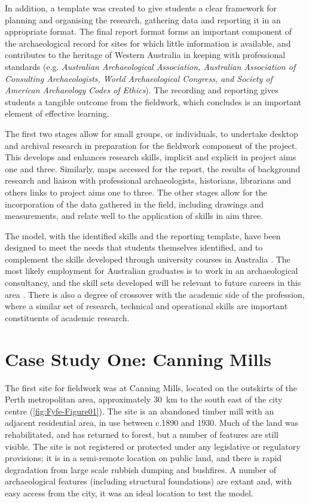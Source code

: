 \documentclass{ijsra}
\begin{document}
In addition, a template was created to give students a clear framework for planning and organising the research, gathering data and reporting it in an appropriate format. 
The final report format forms an important component of the archaeological record for sites for which little information is available, and contributes to the heritage of Western Australia in keeping with professional standards (e.g. \emph{Australian Archaeological Association, Australian Association of Consulting Archaeologists, World Archaeological Congress, and Society of American Archaeology Codes of Ethics}). 
The recording and reporting gives students a tangible outcome from the fieldwork, which \textcite[113-116]{mytum2012c} concludes is an important element of effective learning.

The first two stages allow for small groups, or individuals, to undertake desktop and archival research in preparation for the fieldwork component of the project. 
This develops and enhances research skills, implicit and explicit in project aims one and three. Similarly, maps accessed for the report, the results of background research and liaison with professional archaeologists, historians, librarians and others links to project aims one to three. 
The other stages allow for the incorporation of the data gathered in the field, including drawings and measurements, and relate well to the application of skills in aim three.

The model, with the identified skills and the reporting template, have been designed to meet the needs that students themselves identified, and to complement the skills developed through university courses in Australia \parencite[3]{beck2008}. 
The most likely employment for Australian graduates is to work in an archaeological consultancy, and the skill sets developed will be relevant to future careers in this area \parencites[e.g.][]{ireland2013}{ulm2005}{ulm2013}. 
There is also a degree of crossover with the academic side of the profession, where a similar set of research, technical and operational skills are important constituents of academic research.

\section{Case Study One: Canning Mills}

The first site for fieldwork was at Canning Mills, located on the outskirts of the Perth metropolitan area, approximately \SI {30}{\kilo\meter} 
to the south east of the city centre (\cref{fig:Fyfe-Figure01}). 
The site is an abandoned timber mill with an adjacent residential area, in use between c.1890 and 1930. 
Much of the land was rehabilitated, and has returned to forest, but a number of features are still visible. The site is not registered or protected under any legislative or regulatory provisions; it is in a semi-remote location on public land, and there is rapid degradation from large scale rubbish dumping and bushfires. A number of archaeological features (including structural foundations) are extant and, with easy access from the city, it was an ideal location to test the model.
\end{document}
